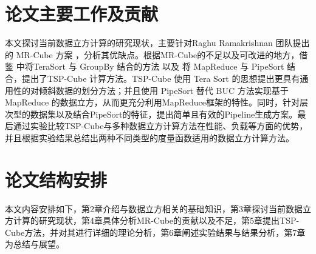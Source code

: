 \section{论文主要工作及贡献}

本文探讨当前数据立方计算的研究现状，主要针对Raghu Ramakrishnan 团队提出的 MR-Cube 方案 \cite{nandi2012data} \cite{nandi2011distributed}，分析其优缺点。根据MR-Cube的不足以及可改进的地方，借鉴\cite{tao2013minimal} 中将TeraSort 与 GroupBy 结合的方法 以及 将 MapReduce 与 PipeSort 结合，提出了TSP-Cube 计算方法。TSP-Cube 使用 Tera Sort 的思想提出更具有通用性的对倾斜数据的划分方法；并且使用 PipeSort 替代 BUC 方法实现基于 MapReduce 的数据立方，从而更充分利用MapReduce框架的特性。同时，针对层次型的数据集以及结合PipeSort的特征，提出简单且有效的Pipeline生成方案。最后通过实验比较TSP-Cube与多种数据立方计算方法在性能、负载等方面的优势，并且根据实验结果总结出两种不同类型的度量函数适用的数据立方计算方法。


\section{论文结构安排}
本文内容安排如下，第2章介绍与数据立方相关的基础知识，第3章探讨当前数据立方计算的研究现状，第4章具体分析MR-Cube的贡献以及不足，第5章提出TSP-Cube方法，并对其进行详细的理论分析，第6章阐述实验结果与结果分析，第7章为总结与展望。

